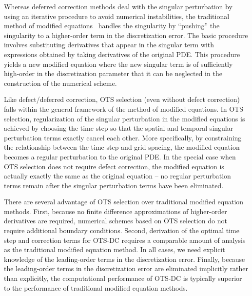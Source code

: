 \documentclass[fleqn,12pt,twoside]{article}
\begin{document}
Whereas deferred correction methods deal with the singular perturbation by
using an iterative procedure to avoid numerical instabilities, the traditional
method of modified equations~\cite{griffiths_1986} handles the
singularity by ``pushing'' the singularity to a higher-order term in the
discretization error.  The basic procedure involves substituting derivatives
that appear in the singular term with expressions obtained by taking
derivatives of the original PDE.  This procedure yields a new modified
equation where the new singular term is of sufficiently high-order in the
discretization parameter that it can be neglected in the construction of the
numerical scheme.

Like defect/deferred correction, OTS selection (even without defect correction)
falls within the general framework of the method of modified equations.
In OTS selection, regularization of the singular perturbation in the modified
equations is achieved by choosing the time step so that the spatial and
temporal singular perturbation terms exactly cancel each other.  More
specifically, by constraining the relationship between the time step and
grid spacing, the modified equation becomes a regular perturbation to the
original PDE.  In the special case when OTS selection does not require
defect correction, the modified equation is actually exactly the same as the
original equation -- no regular perturbation terms remain after the singular
perturbation terms have been eliminated.

There are several advantage of OTS selection over traditional modified
equation methods.  First, because no finite difference approximations of
higher-order derivatives are required, numerical schemes based on OTS
selection do not require additional boundary conditions.  Second, derivation
of the optimal time step and correction terms for OTS-DC requires a comparable
amount of analysis as the traditional modified equation method.  In all cases,
we need explicit knowledge of the leading-order terms in the discretization
error.  Finally, because the leading-order terms in the discretization error
are eliminated implicitly rather than explicitly, the computational
performance of OTS-DC is typically superior to the performance of traditional
modified equation methods.
\end{document}
